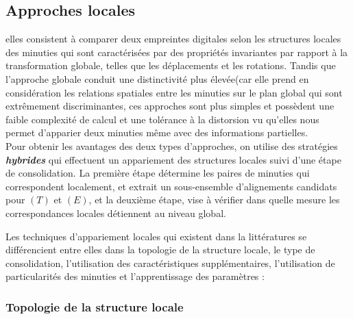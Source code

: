 \subsection{Approches locales }
    elles consistent à comparer deux empreintes digitales selon les structures locales des minuties qui sont caractérisées par des propriétés invariantes par rapport à la transformation globale, telles que les déplacements et les rotations.
	Tandis que l'approche globale conduit une distinctivité plus élevée(car elle prend en considération  les relations spatiales entre les minuties sur le plan global qui sont extrêmement discriminantes, ces approches sont plus simples et possèdent une faible complexité de calcul et une tolérance à la distorsion vu qu'elles nous permet d'apparier deux minuties même avec des informations partielles.
	\\Pour obtenir les avantages des deux types d'approches, on utilise des stratégies \textit{\textbf{hybrides}} qui effectuent un appariement des structures locales suivi d'une étape de consolidation. La première étape détermine les paires de minuties qui correspondent localement, et extrait un sous-ensemble d'alignements candidats pour $ (T) $ et $ (E) $, et la deuxième étape, vise à vérifier dans quelle mesure les correspondances locales détiennent au niveau global. 

	Les techniques d’appariement locales qui existent dans la littératures se différencient entre elles dans la topologie de la structure locale, le type de consolidation, l’utilisation des caractéristiques supplémentaires, l’utilisation de particularités des minuties et l’apprentissage des paramètres \citep{Peralta2015a} :
	\subsubsection{Topologie de la structure locale  }

